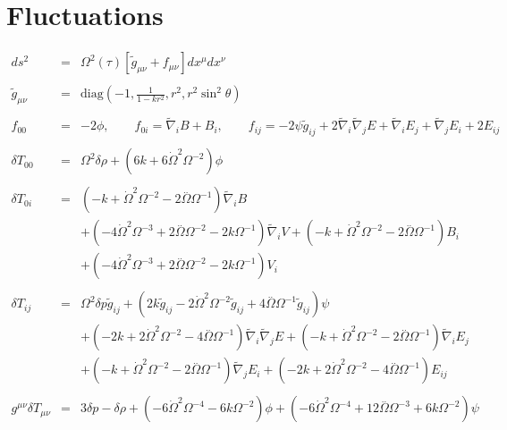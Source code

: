 \documentclass[10pt,letterpaper]{article}
\numberwithin{equation}{section}
\begin{document}
\section{Fluctuations}
\begin{eqnarray}
ds^2 &=& \Omega^2(\tau)[\tilde g_{\mu\nu}+ f_{\mu\nu}] dx^\mu dx^\nu
\\ \nonumber\\
\tilde g_{\mu\nu} &=& \text{diag}\left(-1,\frac{1}{1-kr^2},r^2,r^2\sin^2\theta\right)
\\ \nonumber\\
f_{00} &=& -2\phi,\qquad f_{0i} = \tilde\nabla_i B + B_i,\qquad f_{ij} = -2\psi \tilde g_{ij} + 2\tilde\nabla_i\tilde\nabla_j E + 
\tilde\nabla_i E_j +\tilde\nabla_j E_i + 2E_{ij}
\label{svt}
\\ \nonumber\\
\delta T_{00}&=& \Omega^2 \delta \rho + (6 k + 6 \dot{\Omega}^2 \Omega^{-2}) \phi 
\\  \nonumber\\ 
\delta T_{0i}&=& (- k + \dot{\Omega}^2 \Omega^{-2} - 2 \overset{..}{\Omega} \Omega^{-1}) \tilde{\nabla}_{i}B \nonumber \\ 
&& + (-4 \dot{\Omega}^2 \Omega^{-3} + 2 \overset{..}{\Omega} \Omega^{-2} - 2 k \Omega^{-1}) \tilde{\nabla}_{i}V+(- k + \dot{\Omega}^2 \Omega^{-2} - 2 \overset{..}{\Omega} \Omega^{-1}) B_{i} \nonumber \\ 
&& + (-4 \dot{\Omega}^2 \Omega^{-3} + 2 \overset{..}{\Omega} \Omega^{-2} - 2 k \Omega^{-1}) V_{i}
\\  \nonumber\\ 
\delta T_{ij}&=& \Omega^2 \delta p \tilde{g}_{ij} + (2 k \tilde{g}_{ij} - 2 \dot{\Omega}^2 \Omega^{-2} \tilde{g}_{ij} + 4 \overset{..}{\Omega} \Omega^{-1} \tilde{g}_{ij}) \psi \nonumber \\ 
&& + (-2 k + 2 \dot{\Omega}^2 \Omega^{-2} - 4 \overset{..}{\Omega} \Omega^{-1}) \tilde{\nabla}_{i}\tilde{\nabla}_{j}E+(- k + \dot{\Omega}^2 \Omega^{-2} - 2 \overset{..}{\Omega} \Omega^{-1}) \tilde{\nabla}_{i}E_{j} \nonumber \\ 
&& + (- k + \dot{\Omega}^2 \Omega^{-2} - 2 \overset{..}{\Omega} \Omega^{-1}) \tilde{\nabla}_{j}E_{i}+(-2 k + 2 \dot{\Omega}^2 \Omega^{-2} - 4 \overset{..}{\Omega} \Omega^{-1}) E_{ij}
\\  \nonumber\\ 
g^{\mu\nu}\delta T_{\mu\nu}&=& 3 \delta p -  \delta \rho + (-6 \dot{\Omega}^2 \Omega^{-4} - 6 k \Omega^{-2}) \phi + (-6 \dot{\Omega}^2 \Omega^{-4} + 12 \overset{..}{\Omega} \Omega^{-3} + 6 k \Omega^{-2}) \psi \nonumber \\ 

\end{eqnarray}
\end{document}
